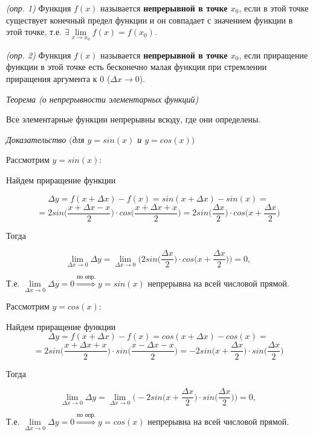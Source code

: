 \textit{(опр. 1)} Функция $f(x)$ называется \textbf{непрерывной в точке $x_0$}, если в этой точке существует конечный предел функции и он совпадает с значением функции в этой точке, т.е. $\exists \lim\limits_{x \to x_0}f(x) = f(x_0)$.

\textit{(опр. 2)} Функция $f(x)$ называется \textbf{непрерывной в точке $x_0$}, если приращение функции в этой точке есть бесконечно малая функция при стремлении приращения аргумента к 0 ($\Delta x \rightarrow 0$).

\textit{Теорема (о непрерывности элементарных функций)}

Все элементарные функции непрерывны всюду, где они определены.
\vspace*{20pt} 

\textit{Доказательство $($для $y = sin(x)$ и $y = cos( x))$}
\vspace*{20pt} 

Рассмотрим $y = sin(x)$:

Найдем приращение функции

$$
\Delta y = f(x + \Delta x) - f(x) = sin(x + \Delta x) - sin(x) =
$$ $$
= 2sin{\Big(}\dfrac{x + \Delta x - x}{2}{\Big)}\cdot cos\Big(\dfrac{x + \Delta x + x}{2}{\Big)} = 2sin{\Big(}\dfrac{\Delta x}{2}{\Big)}\cdot cos\Big(x + \dfrac{ \Delta x }{2}{\Big)}
$$

Тогда

$$
\lim\limits_{\Delta x \to 0}\Delta y = \lim\limits_{\Delta x \to 0}\Bigg(2sin{\Big(}\dfrac{\Delta x}{2}{\Big)}\cdot cos\Big(x + \dfrac{ \Delta x }{2}{\Big)}\Bigg) = 0, 
$$

Т.е. $\lim\limits_{\Delta x \to 0}\Delta y = 0 \overset{\text{по опр.}}\Rightarrow y = sin(x)$ непрерывна на всей числовой прямой.
\vspace*{20pt} 

Рассмотрим $y = cos(x)$:

Найдем приращение функции $$
\Delta y = f(x + \Delta x) - f(x) = cos(x + \Delta x) - cos(x) =
$$ $$
=2sin{\Big(}\dfrac{x + \Delta x + x}{2}{\Big)}\cdot sin\Big(\dfrac{x - \Delta x - x}{2}{\Big)} = -2sin\Big(x + \dfrac{ \Delta x }{2}{\Big)}\cdot sin{\Big(}\dfrac{\Delta x}{2}{\Big)} 
$$

Тогда

$$
\lim\limits_{\Delta x \to 0}\Delta y = \lim\limits_{\Delta x \to 0}\Bigg(-2sin\Big(x + \dfrac{ \Delta x }{2}{\Big)}\cdot sin{\Big(}\dfrac{\Delta x}{2}{\Big)}\Bigg) = 0, 
$$

Т.е. $\lim\limits_{\Delta x \to 0}\Delta y = 0 \overset{\text{по опр.}}\Rightarrow y = cos(x)$ непрерывна на всей числовой прямой.
\newpage 
